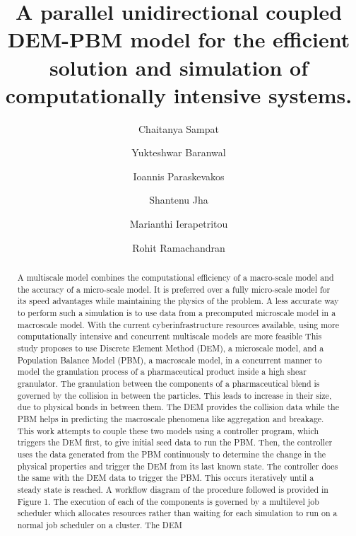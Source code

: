 \documentclass[preprint,11pt,authoryear]{elsarticle}
\begin{document}
\begin{frontmatter}

\title{A parallel unidirectional coupled DEM-PBM model for the efficient solution and simulation of 
computationally  intensive systems.}
\author[add1]{Chaitanya Sampat}
\author[add1]{Yukteshwar Baranwal}
\author[add2]{Ioannis Paraskevakos}
\author[add2]{Shantenu Jha}
\author[add1]{Marianthi Ierapetritou}
\author[add1]{Rohit Ramachandran}
\address[add1]{Department of Chemical and Biochemical Engineering, Rutgers, The State University of New
Jersey, Piscataway, NJ, USA-08854}
\address[add2]{Electrical and Computer Engineering, Rutgers, The State University of New Jersey, 
Piscataway, NJ, USA-08854}

\begin{abstract}
A multiscale model combines the computational efficiency of a macro-scale model and the 
accuracy of a micro-scale model. It is preferred over a fully micro-scale model for its speed 
advantages while maintaining the physics of the problem. A less accurate way to perform such a
simulation is to use data from a precomputed microscale model in a macroscale model. With the
current cyberinfrastructure resources available, using more computationally intensive and 
concurrent multiscale models are more feasible This study proposes to use Discrete Element Method
(DEM), a microscale model, and a Population Balance Model (PBM), a macroscale model, in a
concurrent manner to model the granulation process of a pharmaceutical product inside a high
shear granulator. The granulation between the components of a pharmaceutical blend is governed
by the collision in between the particles. This leads to increase in their size, due to physical bonds
in between them. The DEM provides the collision data while the PBM helps in predicting the
macroscale phenomena like aggregation and breakage. This work attempts to couple these two
models using a controller program, which triggers the DEM first, to give initial seed data to run
the PBM. Then, the controller uses the data generated from the PBM continuously to determine
the change in the physical properties and trigger the DEM from its last known state. The controller
does the same with the DEM data to trigger the PBM. This occurs iteratively until a steady state
is reached. A workflow diagram of the procedure followed is provided in Figure 1. The execution
of each of the components is governed by a multilevel job scheduler which allocates resources
rather than waiting for each simulation to run on a normal job scheduler on a cluster. The DEM

\end{abstract}
\end{frontmatter}
\end{document}
